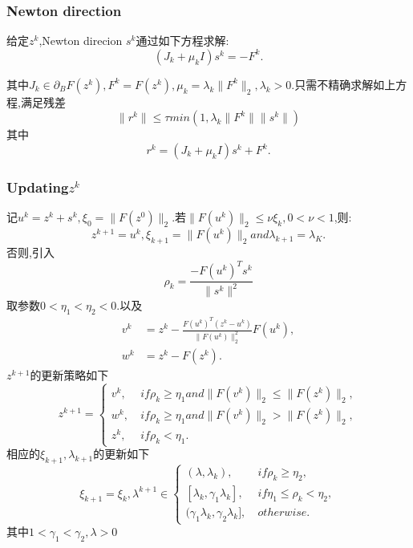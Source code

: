 \documentclass[UTF8]{ctexart}
\begin{document}
\subsubsection{Newton direction}
给定$z^k$,Newton direcion $s^k$通过如下方程求解:
\begin{equation}\label{eq:s}
  (J_k+\mu_k I)s^k=-F^k.
\end{equation}

其中$J_k\in \partial_B F(z^k),F^k=F(z^k),\mu_k=\lambda_k\|F^k\|_2,\lambda_k>0$.只需不精确求解如上方程,满足残差
$$
\|r^k\|\leq \tau min(1,\lambda_k \|F^k\|\|s^k\|)
$$
其中
$$
r^k = (J_k+\mu_k I)s^k+F^k.
$$
\subsubsection{Updating$ z^k$}
记$u^k=z^k+s^k,\xi_0=\|F(z^0)\|_2. $若$\|F(u^k)\|_2\leq \nu \xi_k,0<\nu <1$,则:
\begin{equation}\label{eq:z1}
  z^{k+1} = u^k,\xi_{k+1}=\|F(u^k)\|_2and\lambda_{k+1}=\lambda_K.
\end{equation}
否则,引入
$$
\rho_k = \frac{-F(u^k)^Ts^k}{\|s^k\|^2}
$$
取参数$0<\eta_1<\eta_2<0.$以及
\begin{align*}
  v^k & =z^k - \frac{F(u^k)^T(z^k-u^k)}{\|F(u^k)\|_2^2}F(u^k), \\
  w^k & =z^k-F(z^k).
\end{align*}
$z^{k+1}$的更新策略如下
\begin{equation}\label{eq:z}
z^{k+1}=\left\{
\begin{split}
  v^k, &\ if \rho_k\geq \eta_1 and \|F(v^k)\|_2 \leq\|F(z^k)\|_2 ,    \\
  w^k, &\ if \rho_k\geq \eta_1 and \|F(v^k)\|_2 >\|F(z^k)\|_2 ,\\
  z^k, &\ if \rho_k< \eta_1.
\end{split}
\right.
\end{equation}
相应的$\xi_{k+1},\lambda_{k+1}$的更新如下
\begin{equation}\label{eq:xi}
\xi_{k+1}=\xi_k,
\lambda^{k+1}\in\left\{
\begin{split}
  (\lambda,\lambda_k), &\ if \rho_k\geq \eta_2,    \\
  [\lambda_k,\gamma_1\lambda_k], &\ if \eta_1 \leq \rho_k< \eta_2,\\
  (\gamma_1\lambda_k,\gamma_2\lambda_k], &\ otherwise.
\end{split}
\right.
\end{equation}
其中$1<\gamma_1<\gamma_2,\lambda>0$
\end{document}
